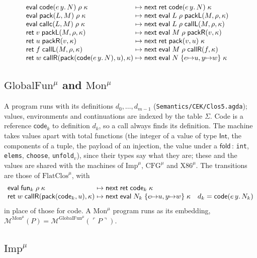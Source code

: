 \documentclass[10pt]{article}
\theoremstyle{acmplain}
\newcommand{\key}[1]{\mathsf{#1}}
\newcommand{\funref}[1]{\key{fun}_{#1}}
\newcommand{\ev}[3]{\key{eval}\;#1\;#2\;#3}
\newcommand{\rt}[2]{\key{ret}\;#1\;#2}
\newcommand{\nxt}{\key{next}\;}
\newcommand{\Mach}[1]{\mathcal{M}^{#1}}
\newcommand{\codeV}[1]{\key{code}_{#1}}
\newcommand{\Kf}[2]{\key{#1}(#2)}
\newcommand{\Tcodetm}[3]{\key{code}(#1\,#2.\,#3)}  %
\newcommand{\Tpack}[2]{\key{pack}(#1, #2)}     %
\newcommand{\Tcallc}[2]{\key{callc}(#1, #2)}   %
\newcommand{\Tembed}[1]{\ulcorner #1 \urcorner}  %
\newcommand{\TcodeV}[1]{\key{code}(#1)}                   %
\newcommand{\Ml}[1]{\textrm{#1}^{\mu}}                  %
\newcommand{\Mfold}{\key{fold}\,}
\begin{document}
\[
\begin{array}{@{}l@{\;\mapsto\;}l@{\quad}l@{}}
  \ev{\Tcodetm{e}{y}{N}}{\rho}{\kappa} & \nxt \rt{\TcodeV{e\, y.\, N}}{\kappa} \\
  \ev{\Tpack{L}{M}}{\rho}{\kappa} & \nxt \ev{L}{\rho}{\Kf{packL}{M, \rho, \kappa}} \\
  \ev{\Tcallc{L}{M}}{\rho}{\kappa} & \nxt \ev{L}{\rho}{\Kf{callL}{M, \rho, \kappa}} \\
  \rt{v}{\Kf{packL}{M, \rho, \kappa}} & \nxt \ev{M}{\rho}{\Kf{packR}{v, \kappa}} \\
  \rt{u}{\Kf{packR}{v, \kappa}} & \nxt \rt{\Tpack{v}{u}}{\kappa} \\
  \rt{f}{\Kf{callL}{M, \rho, \kappa}} & \nxt \ev{M}{\rho}{\Kf{callR}{f, \kappa}} \\
  \rt{w}{\Kf{callR}{\Tpack{\TcodeV{e\, y.\, N}}{u}, \kappa}} & \nxt \ev{N}{\{e {\mapsto} u, y {\mapsto} w\}}{\kappa}
\end{array}
\]

\subsection{\texorpdfstring{$\Ml{GlobalFun}$ and $\Ml{Mon}$}{GlobalFun-mu and Mon-mu}}

A program runs with its definitions $d_0, \ldots, d_{m-1}$
(\texttt{Semantics/CEK/Clos5.agda}); values, environments and
continuations are indexed by the table $\Sigma$. Code is a reference
$\codeV{k}$ to definition $d_k$, so a call always finds its definition.
The machine takes values apart with total functions (the integer of a
value of type $\key{Int}$, the components of a tuple, the payload of an
injection, the value under a $\Mfold$: \texttt{int}, \texttt{elems},
\texttt{choose}, \texttt{unfold$_v$}), since their types say what they are;
these and the values are shared with the machines of $\Ml{Imp}$, $\Ml{CFG}$
and $\Ml{X86}$. The transitions are those of $\Ml{FlatClos}$, with
\[
\begin{array}{@{}l@{\;\mapsto\;}l@{\quad}l@{}}
  \ev{\funref{k}}{\rho}{\kappa} & \nxt \rt{\codeV{k}}{\kappa} \\
  \rt{w}{\Kf{callR}{\Tpack{\codeV{k}}{u}, \kappa}} & \nxt \ev{N_k}{\{e {\mapsto} u, y {\mapsto} w\}}{\kappa}
    & d_k = \Tcodetm{e}{y}{N_k}
\end{array}
\]
in place of those for code. A $\Ml{Mon}$ program runs as its embedding,
$\Mach{\Ml{Mon}}(P) = \Mach{\Ml{GlobalFun}}(\Tembed{P})$.

\subsection{\texorpdfstring{$\Ml{Imp}$}{Imp-mu}}
\end{document}

